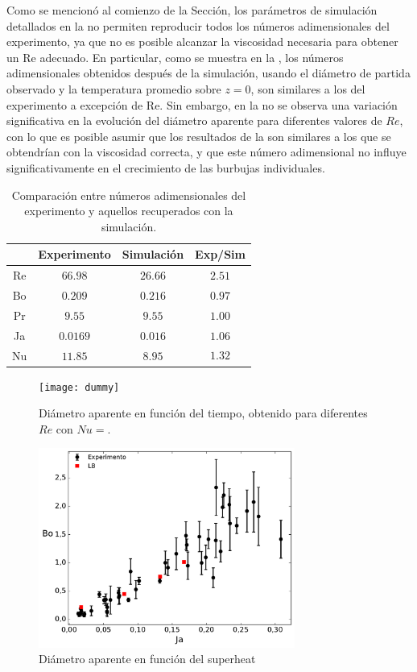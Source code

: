 Como se mencion\'o al comienzo de la Secci\'on, los par\'ametros de simulaci\'on detallados en la  no permiten reproducir todos los n\'umeros adimensionales del experimento, ya que no es posible alcanzar la viscosidad necesaria para obtener un Re adecuado. En particular, como se muestra en la , los n\'umeros adimensionales obtenidos despu\'es de la simulaci\'on, usando el di\'ametro de partida observado y la temperatura promedio sobre $z=0$, son similares a los del experimento a excepci\'on de Re. Sin embargo, en la  no se observa una variaci\'on significativa en la evoluci\'on del di\'ametro aparente para diferentes valores de $Re$, con lo que es posible asumir que los resultados de la  son similares a los que se obtendr\'ian con la viscosidad correcta, y que este n\'umero adimensional no influye significativamente en el crecimiento de las burbujas individuales.

\begin{table}[ht]
	\centering
    \begin{tabular}{c c c c}
	    \toprule
         & \bf Experimento & \bf Simulaci\'on & \bf Exp/Sim\\
        \midrule
		Re & $66.98$  & $26.66$ & $2.51$ \\
		Bo & $0.209$  & $0.216$ & $0.97$ \\
		Pr & $9.55$   & $9.55$  & $1.00$ \\
		Ja & $0.0169$ & $0.016$ & $1.06$  \\
		Nu & $11.85$  & $8.95$  & $$1.32$$ \\		
        \bottomrule
	\end{tabular}
	\caption{Comparaci\'on entre n\'umeros adimensionales del experimento y aquellos recuperados con la simulaci\'on.}
	\label{tab:adim_reproducidos}
\end{table} 

\begin{figure}[ht]
	\centering
	\texttt{[image: dummy]}
	\caption{Di\'ametro aparente en funci\'on del tiempo, obtenido para diferentes $Re$ con $Nu=$.}
	\label{fig:d_vs_t_Re}
\end{figure}
\FloatBarrier


\begin{figure}[ht]
	\centering
	\includegraphics[width=0.75\textwidth]{Imagenes/FC72/Bo_vs_Ja/Bo_vs_Ja}
	\caption{Di\'ametro aparente en funci\'on del superheat}
	\label{fig:Bo_vs_Ja}
\end{figure}
\FloatBarrier

